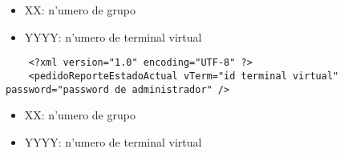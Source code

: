  
\begin{itemize}
    \item{XX: n'umero de grupo}
    \item{YYYY: n'umero de terminal virtual}
\end{itemize}

\begin{verbatim}
    <?xml version="1.0" encoding="UTF-8" ?>
    <pedidoReporteEstadoActual vTerm="id terminal virtual" password="password de administrador" />
\end{verbatim}


 
\begin{itemize}
    \item{XX: n'umero de grupo}
    \item{YYYY: n'umero de terminal virtual}
\end{itemize}

